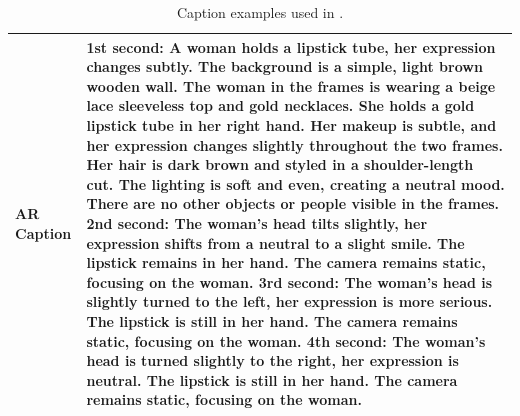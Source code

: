 \begin{table}
\begin{tabular}{m{3cm}|p{10cm}}
\midrule
AR Caption & \textbf{1st second:} A woman holds a lipstick tube, her expression changes subtly. The background is a simple, light brown wooden wall. The woman in the frames is wearing a beige lace sleeveless top and gold necklaces. She holds a gold lipstick tube in her right hand. Her makeup is subtle, and her expression changes slightly throughout the two frames. Her hair is dark brown and styled in a shoulder-length cut. The lighting is soft and even, creating a neutral mood. There are no other objects or people visible in the frames. \newline\newline \textbf{2nd second:} The woman's head tilts slightly, her expression shifts from a neutral to a slight smile. The lipstick remains in her hand. The camera remains static, focusing on the woman. \newline\newline\textbf{3rd second:} The woman's head is slightly turned to the left, her expression is more serious. The lipstick is still in her hand. The camera remains static, focusing on the woman. \newline\newline\textbf{4th second:} The woman's head is turned slightly to the right, her expression is neutral. The lipstick is still in her hand. The camera remains static, focusing on the woman. \\
\bottomrule
\end{tabular}
\vspace{0.5em}
\caption{Caption examples used in \magi.}
\label{table:caption_examples}
\end{table}

